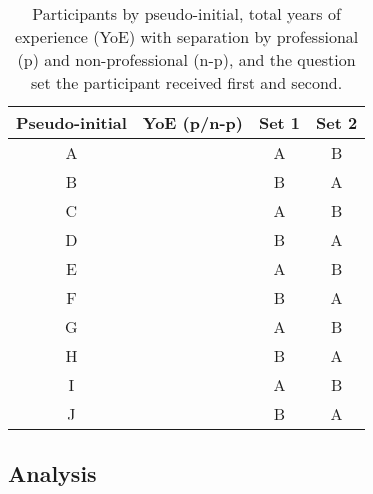 \begin{table}[h]
  \centering
  \begin{tabular}{@{}clcc@{}}
    \toprule
    \multicolumn{1}{l}{Pseudo-initial} & YoE (p/n-p) & \multicolumn{1}{l}{Set 1} & \multicolumn{1}{l}{Set 2} \\ \midrule
    A                                  &             & A                                  & B                               \\
    B                                  &             & B                                  & A                               \\
    C                                  &             & A                                  & B                               \\
    D                                  &             & B                                  & A                               \\
    E                                  &             & A                                  & B                               \\
    F                                  &             & B                                  & A                               \\
    G                                  &             & A                                  & B                               \\
    H                                  &             & B                                  & A                               \\
    I                                  &             & A                                  & B                               \\
    J                                  &             & B                                  & A                               \\ \bottomrule
  \end{tabular}
  \caption{
    Participants by pseudo-initial, total years of experience (YoE) with separation by professional (p) and non-professional (n-p), and the question set the participant received first and second.
  }
  \label{tab:Participants}
\end{table}

\subsection{Analysis}

